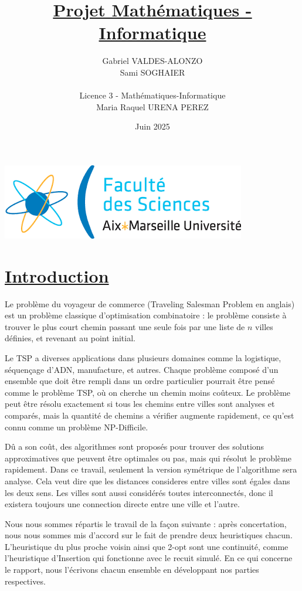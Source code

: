 \documentclass[a4paper,11pt,fleqn]{article}
\title{\underline{Projet Mathématiques - Informatique}}
\author{Gabriel VALDES-ALONZO\\ Sami SOGHAIER  \\\\ Licence 3 - Mathématiques-Informatique \\ Maria Raquel URENA PEREZ }
\date{Juin 2025}
\begin{document}
\maketitle
\begin{center}
    \includegraphics[scale=0.7]{index.png}
\end{center}

\newpage
{}

\section*{\underline{Introduction}}
Le problème du voyageur de commerce \cite{book:TSP,chap:TSP} (Traveling Salesman Problem en anglais) est un problème classique d’optimisation combinatoire : le problème consiste à trouver le plus court chemin passant une seule fois par une liste de $n$ villes définies, et revenant au point initial.

Le TSP a diverses applications dans plusieurs domaines comme la logistique, séquençage d'ADN, manufacture, et autres. Chaque problème composé d'un ensemble que doit être rempli dans un ordre particulier pourrait être pensé comme le problème TSP, où on cherche un chemin moins coûteux. Le problème peut être résolu exactement si tous les chemins entre villes sont analyses et comparés, mais la quantité de chemins a vérifier augmente rapidement, ce qu'est connu comme un problème NP-Difficile.

Dû a son coût, des algorithmes sont proposés pour trouver des solutions approximatives que peuvent être optimales ou pas, mais qui résolut le problème rapidement. Dans ce travail, seulement la version symétrique de l'algorithme sera analyse. Cela veut dire que les distances consideres entre villes sont égales dans les deux sens. Les villes sont aussi considérés toutes interconnectés, donc il existera toujours une connection directe entre une ville et l'autre.

Nous nous sommes répartis le travail de la façon suivante : après concertation, nous nous sommes mis d'accord sur le fait de prendre deux heuristiques chacun. L'heuristique du plus proche voisin ainsi que 2-opt sont une continuité, comme l'heuristique d'Insertion qui fonctionne avec le recuit simulé. 
En ce qui concerne le rapport, nous l'écrivons chacun ensemble en développant nos parties respectives.
\end{document}
